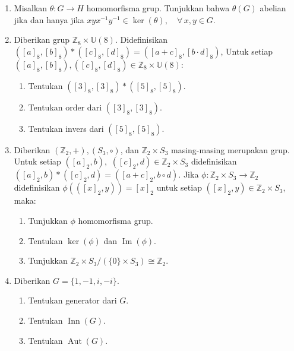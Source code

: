 \documentclass[10pt,openany,a4paper]{article}
\newcommand{\U}{\mathbb{U}}
\begin{document}
\begin{enumerate}
    \item Misalkan $\theta : G \to H$ homomorfisma grup. Tunjukkan bahwa $\theta(G)$ abelian jika dan hanya jika $xyx^{-1}y^{-1} \in \ker(\theta), \quad \forall \, x, y \in G.$

    \item Diberikan grup $\mathbb{Z}_8 \times \U(8)$. Didefinisikan $([a]_8, [b]_8) * ([c]_8, [d]_8) = ([a + c]_8, [b \cdot d]_8)$, Untuk setiap $([a]_8, [b]_8), ([c]_8, [d]_8) \in \mathbb{Z}_8 \times \U(8)$:
    \begin{enumerate}
        \item Tentukan $([3]_8, [3]_8) * ([5]_8, [5]_8)$.
        \item Tentukan order dari $([3]_8, [3]_8)$.
        \item Tentukan invers dari $([5]_8, [5]_8)$.
    \end{enumerate}

    \item Diberikan $(\mathbb{Z}_2, +), (S_3, \circ)$, dan $\mathbb{Z}_2 \times S_3$ masing-masing merupakan grup. Untuk setiap 
    $([a]_2, b),$ $([c]_2, d) \in \mathbb{Z}_2 \times S_3$ didefinisikan $([a]_2, b) * ([c]_2, d) = ([a + c]_2, b \circ d)$. Jika $\phi : \mathbb{Z}_2 \times S_3 \to \mathbb{Z}_2$ didefinisikan $\phi(([x]_2, y)) = [x]_2$ untuk setiap $([x]_2, y) \in \mathbb{Z}_2 \times S_3$, maka:
    \begin{enumerate}
        \item Tunjukkan $\phi$ homomorfisma grup.
        \item Tentukan $\ker(\phi)$ dan $\operatorname{Im}(\phi)$.
        \item Tunjukkan $\mathbb{Z}_2 \times S_3 / (\{0\} \times S_3) \cong \mathbb{Z}_2$.
    \end{enumerate}

    \item Diberikan $G = \{1, -1, i, -i\}$.
    \begin{enumerate}
        \item Tentukan generator dari $G$.
        \item Tentukan $\operatorname{Inn}(G)$.
        \item Tentukan $\operatorname{Aut}(G)$.
    \end{enumerate}
\end{enumerate}
\end{document}
